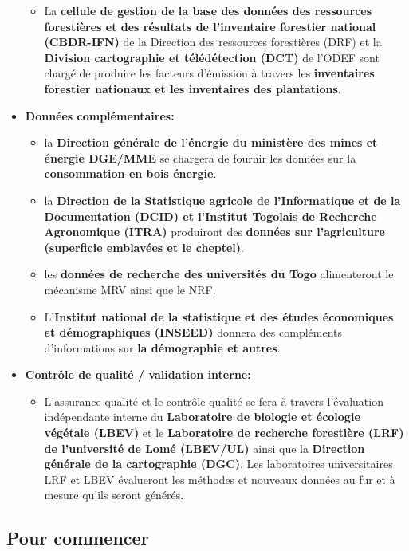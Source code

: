 \documentclass[a4paper, notitlepage, 12pt, krantz2]{krantz}
\providecommand{\tightlist}{%
  \setlength{\itemsep}{0pt}\setlength{\parskip}{0pt}}
\begin{document}
\begin{itemize}
  \begin{itemize}
  \tightlist
  \item
    La \textbf{cellule de gestion de la base des données des ressources forestières et des résultats de l'inventaire forestier national (CBDR-IFN)} de la Direction des ressources forestières (DRF) et la \textbf{Division cartographie et télédétection (DCT)} de l'ODEF sont chargé de produire les facteurs d'émission à travers les \textbf{inventaires forestier nationaux et les inventaires des plantations}.
  \end{itemize}
\item
  \textbf{Données complémentaires:}

  \begin{itemize}
  \item
    la \textbf{Direction générale de l'énergie du ministère des mines et énergie DGE/MME} se chargera de fournir les données sur la \textbf{consommation en bois énergie}.
  \item
    la \textbf{Direction de la Statistique agricole de l'Informatique et de la Documentation (DCID) et l'Institut Togolais de Recherche Agronomique (ITRA)} produiront des \textbf{données sur l'agriculture (superficie emblavées et le cheptel)}.
  \item
    les \textbf{données de recherche des universités du Togo} alimenteront le mécanisme MRV ainsi que le NRF.
  \item
    L'\textbf{Institut national de la statistique et des études économiques et démographiques (INSEED)} donnera des compléments d'informations sur \textbf{la démographie et autres}.
  \end{itemize}
\item
  \textbf{Contrôle de qualité / validation interne:}

  \begin{itemize}
  \tightlist
  \item
    L'assurance qualité et le contrôle qualité se fera à travers l'évaluation indépendante interne du \textbf{Laboratoire de biologie et écologie végétale (LBEV)} et le \textbf{Laboratoire de recherche forestière (LRF) de l'université de Lomé (LBEV/UL)} ainsi que la \textbf{Direction générale de la cartographie (DGC)}. Les laboratoires universitaires LRF et LBEV évalueront les méthodes et nouveaux données au fur et à mesure qu'ils seront générés.
  \end{itemize}
\end{itemize}

\hypertarget{SNSF-organisation}{%
\subsection{Pour commencer}\label{SNSF-organisation}}
\end{document}

